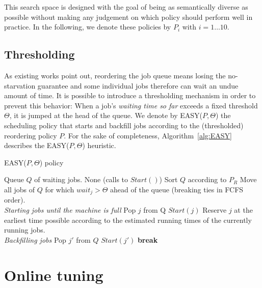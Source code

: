 \documentclass[sigconf]{acmart}
\begin{document}
This search space is designed with the goal of being as semantically diverse as
possible without making any judgement on which policy should perform well in
practice. In the following, we denote these policies by $P_i$ with $i = 1
\ldots 10$.

\subsection{Thresholding}
\label{sub:th}
As existing works point out, reordering the job queue means losing the
no-starvation guarantee and some individual jobs therefore can wait an undue
amount of time. It is possible to introduce a thresholding mechanism in order
to prevent this behavior: When a job's \textit{waiting time so far} exceeds a
fixed threshold $\Theta$, it is jumped at the head of the queue. We denote by
EASY($P,\Theta$) the scheduling policy that starts and backfill jobs according to
the (thresholded) reordering policy $P$. For the sake of completeness,
Algorithm~\ref{alg:EASY} describes the EASY($P,\Theta$) heuristic.

\begin{algorithm}[h]
  \caption{EASY($P,\Theta$) policy}
  \begin{algorithmic}[1]
    \renewcommand{\algorithmicrequire}{\textbf{Input:}}
    \renewcommand{\algorithmicensure}{\textbf{Output:}}
    \REQUIRE Queue $Q$ of waiting jobs.
    \ENSURE None (calls to $Start()$)
    \STATE Sort $Q$ according to $P_R$
    \STATE Move all jobs of $Q$ for which $wait_j > \Theta$ ahead
    of the queue (breaking ties in FCFS order).
    \\ \textit{Starting jobs until the machine is full}
    \STATE Pop $j$ from Q
    \STATE $Start(j)$
    \ELSE
    \STATE Reserve $j$ at the earliest
    time possible according to the estimated running times
    of the currently running jobs.
    \\ \textit{Backfilling jobs}
    \STATE Pop $j'$ from $Q$
    \STATE $Start(j')$
    \ENDIF
    \ENDFOR
    \STATE \textbf{break}
    \ENDIF
    \ENDFOR
  \end{algorithmic}
  \label{alg:EASY}
\end{algorithm}

\section{Online tuning}
\label{sec:online}
\end{document}

